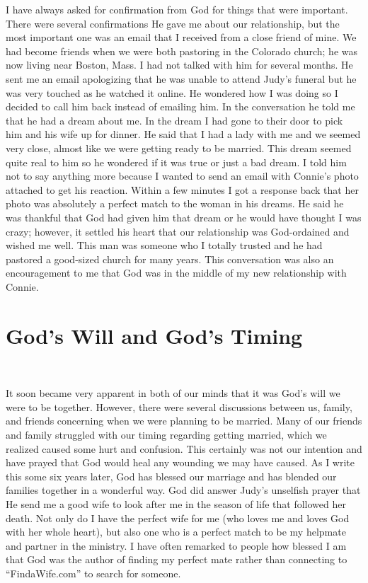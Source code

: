 \documentclass[oneside]{book}
\begin{document}
I have always asked for confirmation from God for things that were important. There were several confirmations He gave me about our relationship, but the most important one was an email that I received from a close friend of mine. We had become friends when we were both pastoring in the Colorado church; he was now living near Boston, Mass. I had not talked with him for several months. He sent me an email apologizing that he was unable to attend Judy’s funeral but he was very touched as he watched it online. He wondered how I was doing so I decided to call him back instead of emailing him. In the conversation he told me that he had a dream about me. In the dream I had gone to their door to pick him and his wife up for dinner. He said that I had a lady with me and we seemed very close, almost like we were getting ready to be married. This dream seemed quite real to him so he wondered if it was true or just a bad dream. I told him not to say anything more because I wanted to send an email with Connie’s photo attached to get his reaction. Within a few minutes I got a response back that her photo was absolutely a perfect match to the woman in his dreams. He said he was thankful that God had given him that dream or he would have thought I was crazy; however, it settled his heart that our relationship was God-ordained and wished me well. This man was someone who I totally trusted and he had pastored a good-sized church for many years. This conversation was also an encouragement to me that God was in the middle of my new relationship with Connie.


\section{God's Will and God's Timing}
\

It soon became very apparent in both of our minds that it was God’s will we were to be together. However, there were several discussions between us, family, and friends concerning when we were planning to be married. Many of our friends and family struggled with our timing regarding getting married, which we realized caused some hurt and confusion. This certainly was not our intention and have prayed that God would heal any wounding we may have caused. As I write this some six years later, God has blessed our marriage and has blended our families together in a wonderful way. God did answer Judy’s unselfish prayer that He send me a good wife to look after me in the season of life that followed her death. Not only do I have the perfect wife for me (who loves me and loves God with her whole heart), but also one who is a perfect match to be my helpmate and partner in the ministry. I have often remarked to people how blessed I am that God was the author of finding my perfect mate rather than connecting to “FindaWife.com” to search for someone.
\end{document}
